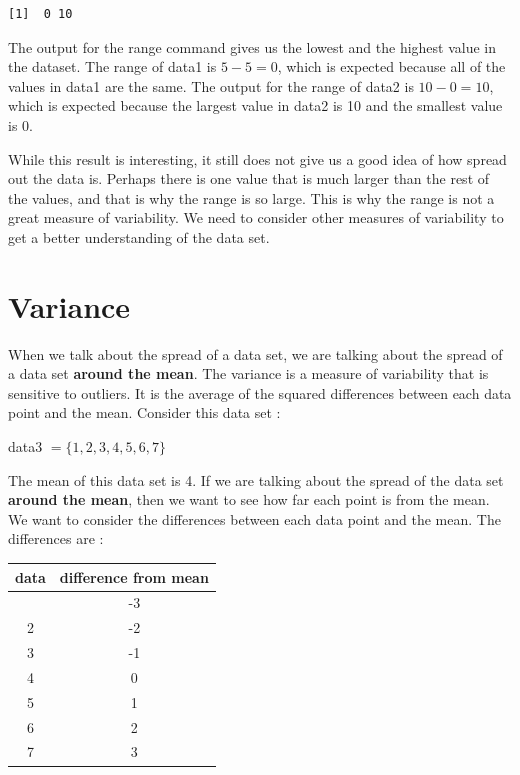 \documentclass[
  letterpaper,
  DIV=11,
  numbers=noendperiod]{scrreprt}
\begin{document}
\begin{verbatim}
[1]  0 10
\end{verbatim}

The output for the range command gives us the lowest and the highest
value in the dataset. The range of data1 is \(5-5=0\), which is expected
because all of the values in data1 are the same. The output for the
range of data2 is \(10-0=10\), which is expected because the largest
value in data2 is 10 and the smallest value is 0.

While this result is interesting, it still does not give us a good idea
of how spread out the data is. Perhaps there is one value that is much
larger than the rest of the values, and that is why the range is so
large. This is why the range is not a great measure of variability. We
need to consider other measures of variability to get a better
understanding of the data set.

\section*{Variance}\label{variance}


When we talk about the spread of a data set, we are talking about the
spread of a data set \textbf{around the mean}. The variance is a measure
of variability that is sensitive to outliers. It is the average of the
squared differences between each data point and the mean. Consider this
data set :

data3 \(= \{1,2,3,4,5,6,7\}\)

The mean of this data set is 4. If we are talking about the spread of
the data set \textbf{around the mean}, then we want to see how far each
point is from the mean. We want to consider the differences between each
data point and the mean. The differences are :

\begin{longtable}[]{@{}cc@{}}
\toprule\noalign{}
data & difference from mean \\
\midrule\noalign{}
\endhead
\bottomrule\noalign{}
\endlastfoot
1 & -3 \\
2 & -2 \\
3 & -1 \\
4 & 0 \\
5 & 1 \\
6 & 2 \\
7 & 3 \\
\end{longtable}
\end{document}
